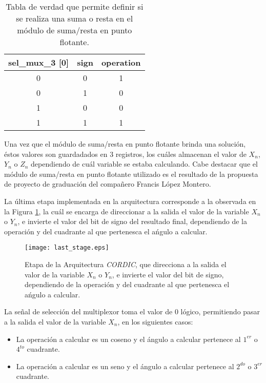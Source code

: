 \begin{table}[H]
\centering
\caption{Tabla de verdad que permite definir si se realiza una suma o resta en el módulo de suma/resta en punto flotante.}
\label{Table:tabla_verdad_op}
\begin{tabular}{|c|c|c|}
\hline
sel\_mux\_3 {[}0{]} & sign & operation \\ \hline
0                   & 0    & 1         \\ \hline
0                   & 1    & 0         \\ \hline
1                   & 0    & 0         \\ \hline
1                   & 1    & 1         \\ \hline
\end{tabular}
\end{table}

Una vez que el módulo de suma/resta en punto flotante brinda una solución, éstos valores son guardadados en 3 registros, los cuáles almacenan el valor de $X_{n}$, $Y_{n}$ o $Z_{n}$ dependiendo de cuál variable se estaba calculando. Cabe destacar que el módulo de suma/resta en punto flotante utilizado es el resultado de la propuesta de proyecto de graduación del compañero Francis López Montero.

La última etapa implementada en la arquitectura corresponde a la observada en la Figura \ref{fig:last_stage}, la cuál se encarga de  direccionar a la salida el valor de la variable $X_{n}$ o $Y_{n}$, e invierte el valor del bit de signo del resultado final, dependiendo de la operación y del cuadrante al que pertenesca el ańgulo a calcular.

\begin{figure}[H]
  \centering
  \texttt{[image: last\_stage.eps]}
  \caption{Etapa de la Arquitectura \textit{CORDIC}, que direcciona a la salida el valor de la variable $X_{n}$ o $Y_{n}$, e invierte el valor del bit de signo, dependiendo de la operación y del cuadrante al que pertenesca el ańgulo a calcular.}
  \label{fig:last_stage}
\end{figure}


La señal de selección del multiplexor toma el valor de 0 lógico, permitiendo pasar a la salida el valor de la variable $X_{n}$,  en los siguientes casos:
\begin{itemize}
\item	La operación a calcular es un coseno y el ángulo a calcular pertenece al $1^{er}$ o $4^{to}$ cuadrante.
\item	La operación a calcular es un seno y el ángulo a calcular pertenece al $2^{do}$ o $3^{er}$ cuadrante.
\end{itemize}

